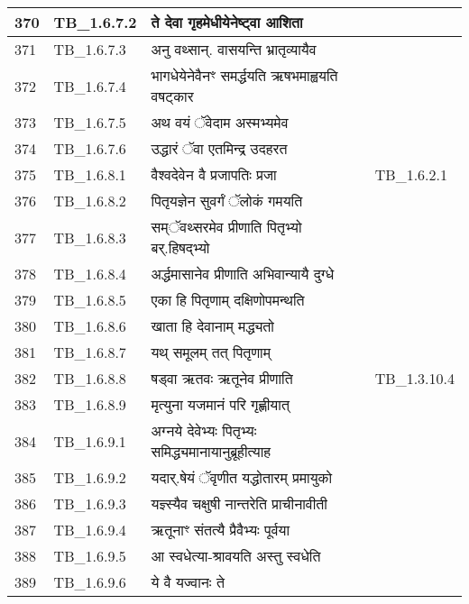 \documentclass[17pt]{extarticle}
\begin{document}
\begin{longtable}{||p{0.4in}||p{0.9in}||p{4.0in}||p{0.9in}||}
        \hline
            370 & TB\_1.6.7.2 & ते देवा गृहमेधीयेनेष्ट्वा आशिता &      \\
        \hline
            371 & TB\_1.6.7.3 & अनु वथ्सान्. वासयन्ति भ्रातृव्यायैव &      \\
        \hline
            372 & TB\_1.6.7.4 & भागधेयेनेवैनꣳ समर्द्धयति ऋषभमाह्वयति वषट्कार &      \\
        \hline
            373 & TB\_1.6.7.5 & अथ वयं ॅवेदाम अस्मभ्यमेव &      \\
        \hline
            374 & TB\_1.6.7.6 & उद्धारं ॅवा एतमिन्द्र उदहरत &      \\
        \hline
            375 & TB\_1.6.8.1 & वैश्वदेवेन वै प्रजापतिः प्रजा & TB\_1.6.2.1        \\
        \hline
            376 & TB\_1.6.8.2 & पितृयज्ञेन सुवर्गं ॅलोकं गमयति &      \\
        \hline
            377 & TB\_1.6.8.3 & सम्ॅवथ्सरमेव प्रीणाति पितृभ्यो बर्.हिषद्भ्यो &      \\
        \hline
            378 & TB\_1.6.8.4 & अर्द्धमासानेव प्रीणाति अभिवान्यायै दुग्धे &      \\
        \hline
            379 & TB\_1.6.8.5 & एका हि पितृणाम् दक्षिणोपमन्थति &      \\
        \hline
            380 & TB\_1.6.8.6 & खाता हि देवानाम् मद्ध्यतो &      \\
        \hline
            381 & TB\_1.6.8.7 & यथ् समूलम् तत् पितृणाम् &      \\
        \hline
            382 & TB\_1.6.8.8 & षड्वा ऋतवः ऋतूनेव प्रीणाति & TB\_1.3.10.4        \\
        \hline
            383 & TB\_1.6.8.9 & मृत्युना यजमानं परि गृह्णीयात् &      \\
        \hline
            384 & TB\_1.6.9.1 & अग्नये देवेभ्यः पितृभ्यः समिद्ध्यमानायानुब्रूहीत्याह &      \\
        \hline
            385 & TB\_1.6.9.2 & यदार्.षेयं ॅवृणीत यद्धोतारम् प्रमायुको &      \\
        \hline
            386 & TB\_1.6.9.3 & यज्ञ्स्यैव चक्षुषी नान्तरेति प्राचीनावीती &      \\
        \hline
            387 & TB\_1.6.9.4 & ऋतूनाꣳ संतत्यै प्रैवैभ्यः पूर्वया &      \\
        \hline
            388 & TB\_1.6.9.5 & आ स्वधेत्या{-}श्रावयति अस्तु स्वधेति &      \\
        \hline
            389 & TB\_1.6.9.6 & ये वै यज्वानः ते &      \\

\end{longtable}
\end{document}
